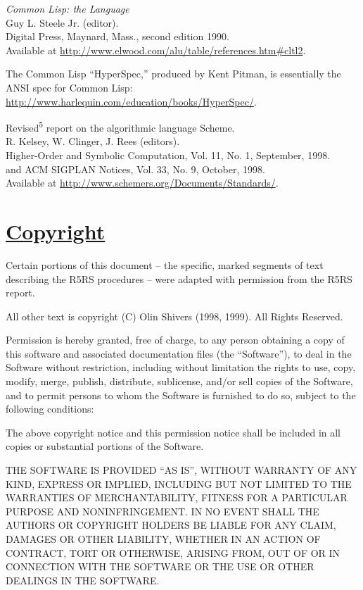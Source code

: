 \begin{description}
\tightlist
\item[\textbf{\href{}{{[}CommonLisp{]}}}]
\emph{Common Lisp: the Language}\\
Guy L. Steele Jr. (editor).\\
Digital Press, Maynard, Mass., second edition 1990.\\
Available at
\url{http://www.elwood.com/alu/table/references.htm\#cltl2}.

The Common Lisp ``HyperSpec,'' produced by Kent Pitman, is essentially
the ANSI spec for Common Lisp:
\url{http://www.harlequin.com/education/books/HyperSpec/}.
\item[\textbf{\href{}{{[}R5RS{]}}}]
Revised\textsuperscript{5} report on the algorithmic language Scheme.\\
R. Kelsey, W. Clinger, J. Rees (editors).\\
Higher-Order and Symbolic Computation, Vol. 11, No. 1, September,
1998.\\
and ACM SIGPLAN Notices, Vol. 33, No. 9, October, 1998.\\
Available at \url{http://www.schemers.org/Documents/Standards/}.
\end{description}

\section{\texorpdfstring{\href{}{Copyright}}{Copyright}}\label{copyright}

Certain portions of this document -- the specific, marked segments of
text describing the R5RS procedures -- were adapted with permission from
the R5RS report.

All other text is copyright (C) Olin Shivers (1998, 1999). All Rights
Reserved.

Permission is hereby granted, free of charge, to any person obtaining a
copy of this software and associated documentation files (the
``Software''), to deal in the Software without restriction, including
without limitation the rights to use, copy, modify, merge, publish,
distribute, sublicense, and/or sell copies of the Software, and to
permit persons to whom the Software is furnished to do so, subject to
the following conditions:

The above copyright notice and this permission notice shall be included
in all copies or substantial portions of the Software.

THE SOFTWARE IS PROVIDED ``AS IS'', WITHOUT WARRANTY OF ANY KIND,
EXPRESS OR IMPLIED, INCLUDING BUT NOT LIMITED TO THE WARRANTIES OF
MERCHANTABILITY, FITNESS FOR A PARTICULAR PURPOSE AND NONINFRINGEMENT.
IN NO EVENT SHALL THE AUTHORS OR COPYRIGHT HOLDERS BE LIABLE FOR ANY
CLAIM, DAMAGES OR OTHER LIABILITY, WHETHER IN AN ACTION OF CONTRACT,
TORT OR OTHERWISE, ARISING FROM, OUT OF OR IN CONNECTION WITH THE
SOFTWARE OR THE USE OR OTHER DEALINGS IN THE SOFTWARE.
